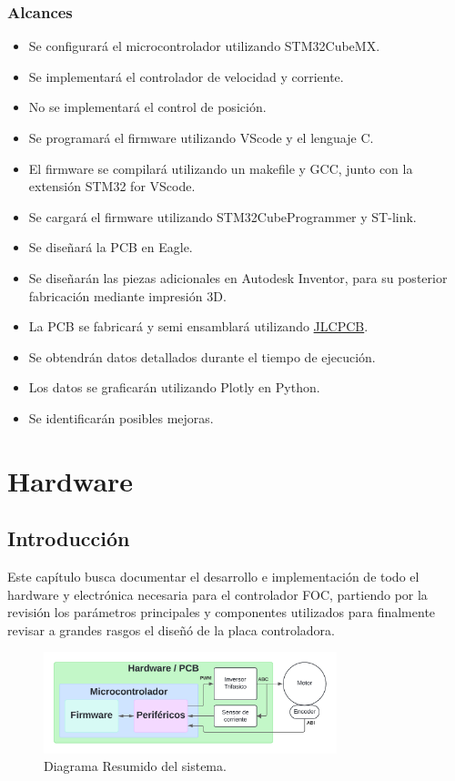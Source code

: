 \documentclass[11pt]{report}
\begin{document}
\subsection{Alcances}
\begin{itemize}
	\item Se configurará el microcontrolador utilizando STM32CubeMX.
	\item Se implementará el controlador de velocidad y corriente.
	\item No se implementará el control de posición.
	\item Se programará el firmware utilizando VScode y el lenguaje C.
	\item El firmware se compilará utilizando un makefile y GCC, junto con la extensión STM32 for VScode.
	\item Se cargará el firmware utilizando STM32CubeProgrammer y ST-link.
	\item Se diseñará la PCB en Eagle.
	\item Se diseñarán las piezas adicionales en Autodesk Inventor, para su posterior fabricación mediante impresión 3D.
	\item La PCB se fabricará y semi ensamblará utilizando \href{https://www.youtube.com/watch?v=riT4nl0T8_M}{JLCPCB}.
	\item Se obtendrán datos detallados durante el tiempo de ejecución.
	\item Los datos se graficarán utilizando Plotly en Python.
	\item Se identificarán posibles mejoras.
\end{itemize}

\chapter{Hardware}
\section{Introducción}
Este capítulo busca documentar el desarrollo e implementación de todo el hardware y electrónica necesaria para el controlador FOC, partiendo por la revisión los parámetros principales y componentes utilizados para finalmente revisar a grandes rasgos el diseñó de la placa controladora.


\begin{figure}[ht]
	\centering
	\includegraphics[width=0.76\textwidth]{imagenes/Diagramas/Diagramas - ultra resumen.png}
	\caption{Diagrama Resumido del sistema.}
	\label{flujo_resumen}
\end{figure}
\FloatBarrier
\end{document}
